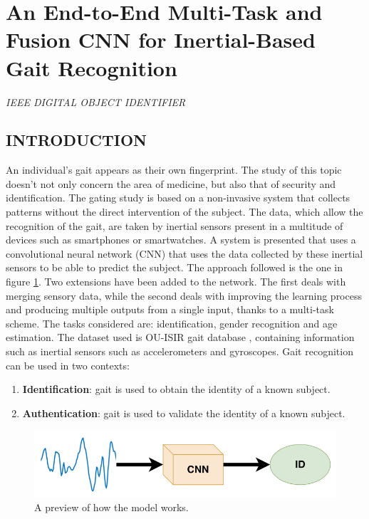 \section{An End-to-End Multi-Task and Fusion CNN for Inertial-Based Gait Recognition}

\begin{flushleft}
    \author{
    Rubén Delgrado-Esca$ \tilde{n} $o,
    Francisco M. Castro,
    Julián Ramos Cózar,
    Manuel J. Marín-Jiménez,
    and Nicolás Guil
    }
\end{flushleft}

\begin{center}
    \emph{IEEE DIGITAL OBJECT IDENTIFIER}
\end{center}

\subsection{INTRODUCTION}
An individual's gait appears as their own fingerprint. The study of this 
topic doesn't not only concern the area of medicine, but also that of security 
and identification. The gating study is based on a non-invasive system that 
collects patterns without the direct intervention of the subject. The data, 
which allow the recognition of the gait, are taken by inertial sensors present 
in a multitude of devices such as smartphones or smartwatches. A system 
is presented that uses a convolutional neural network (CNN) that uses the 
data collected by these inertial sensors to be able to predict the subject. The 
approach followed is the one in figure \ref{fig:preview}. Two extensions have been added 
to the network. The first deals with merging sensory data, while the second 
deals with improving the learning process and producing multiple outputs 
from a single input, thanks to a multi-task scheme. The tasks considered 
are: identification, gender recognition and age estimation. The dataset used 
is OU-ISIR gait database \cite{0857651721}, containing information such as inertial sensors 
such as accelerometers and gyroscopes. Gait recognition can be used in two contexts:
\begin{enumerate}
    \item {\bfseries{Identification}}: gait is used to obtain the identity of a known subject.
    \item {\bfseries{Authentication}}: gait is used to validate the identity of a known subject.
\end{enumerate}
\begin{figure}[htbp]
    \centering
    \includegraphics[width = 0.6 \linewidth]{images/paper5/usecase.png}
    \centering
    \caption{A preview of how the model works.}
    \label{fig:preview}
\end{figure}

